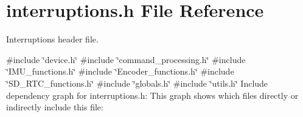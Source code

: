 \section{interruptions.\+h File Reference}
\label{interruptions_8h}


Interruptions header file.  


{\ttfamily \#include \char`\"{}device.\+h\char`\"{}}\newline
{\ttfamily \#include \char`\"{}command\+\_\+processing.\+h\char`\"{}}\newline
{\ttfamily \#include \char`\"{}I\+M\+U\+\_\+functions.\+h\char`\"{}}\newline
{\ttfamily \#include \char`\"{}Encoder\+\_\+functions.\+h\char`\"{}}\newline
{\ttfamily \#include \char`\"{}S\+D\+\_\+\+R\+T\+C\+\_\+functions.\+h\char`\"{}}\newline
{\ttfamily \#include \char`\"{}globals.\+h\char`\"{}}\newline
{\ttfamily \#include \char`\"{}utils.\+h\char`\"{}}\newline
Include dependency graph for interruptions.\+h\+:
This graph shows which files directly or indirectly include this file\+:

